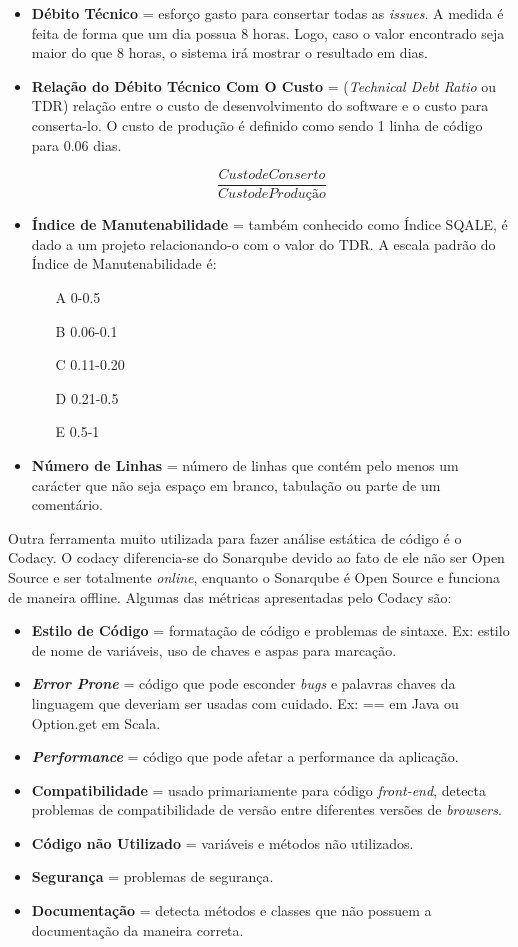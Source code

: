 \begin{itemize}
\item\textbf{Débito Técnico} = esforço gasto para consertar todas as \textit{issues}. A medida é feita de forma que um dia possua 8 horas. Logo, caso o valor encontrado seja maior do que 8 horas, o sistema irá mostrar o resultado em dias.

\item\textbf{Relação do Débito Técnico Com O Custo} = (\textit{Technical Debt Ratio} ou TDR) relação entre o custo de desenvolvimento do software e o custo para conserta-lo. O custo de produção é definido como sendo 1 linha de código para 0.06 dias.

\[\frac{Custo de Conserto}{Custo de Produção}\]

\item\textbf{Índice de Manutenabilidade} = também conhecido como Índice SQALE, é dado a um projeto relacionando-o com o valor do TDR. A escala  padrão do Índice de Manutenabilidade é: 
\begin{itemize}
\item[A] 0-0.5
\item[B] 0.06-0.1
\item[C] 0.11-0.20
\item[D] 0.21-0.5
\item[E] 0.5-1
\end{itemize}

\item\textbf{Número de Linhas} = número de linhas que contém pelo menos um carácter que não seja espaço em branco, tabulação ou parte de um comentário.

\end{itemize}

Outra ferramenta muito utilizada para fazer análise estática de código é o Codacy. O codacy diferencia-se do Sonarqube devido ao fato de ele não ser Open Source e ser totalmente \textit{online}, enquanto o Sonarqube é Open Source e funciona de maneira offline. Algumas das métricas apresentadas pelo Codacy são: 

\begin{itemize}
\item\textbf{Estilo de Código} =  formatação de código e problemas de sintaxe. Ex: estilo de nome de variáveis, uso de chaves e aspas para marcação.
\item\textbf{\textit{Error Prone}} = código que pode esconder \textit{bugs} e palavras chaves da linguagem que deveriam ser usadas com cuidado. Ex: == em Java ou Option.get em Scala.
\item\textbf{\textit{Performance}} = código que pode afetar a performance da aplicação.
\item\textbf{Compatibilidade} = usado primariamente para código \textit{front-end}, detecta problemas de compatibilidade de versão entre diferentes versões de \textit{browsers}.
\item\textbf{Código não Utilizado} = variáveis e métodos não utilizados.
\item\textbf{Segurança} = problemas de segurança.
\item\textbf{Documentação} = detecta métodos e classes que não possuem a documentação da maneira correta.

\end{itemize}

